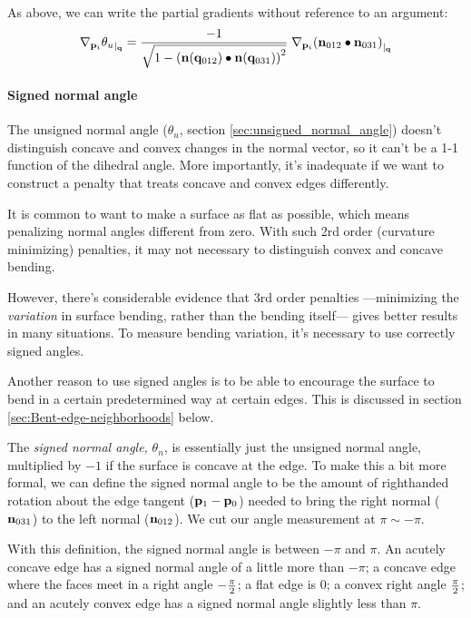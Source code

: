 As above, we can write the partial gradients without reference to an argument:
\begin{equation}
{\mathbf \nabla}_{{\mathbf p}_i}{{\theta_u}}_{\mid_{{\mathbf q}}}
=
{ -1 \over \sqrt{1 - \left( {\mathbf n}({\mathbf q}_{012}) \bullet {\mathbf n}({\mathbf q}_{031}) \right)^2} }
\; {\mathbf \nabla}_{{\mathbf p}_i}{{\left({\mathbf n}_{012}\bullet{\mathbf n}_{031}\right)}}_{\mid_{{\mathbf q}}}
\end{equation}


\paragraph{Signed normal angle}
\label{sec:signed_normal_angle}

The unsigned normal angle
($\theta_u$, section \ref{sec:unsigned_normal_angle})
doesn't distinguish concave and convex changes in the normal vector,
so it can't be a 1-1 function of the dihedral angle.
More importantly, it's inadequate if we want to construct
a penalty that treats concave and convex edges differently.

It is common to want to make a surface as flat as possible,
which means penalizing normal angles different from zero.
With such 2rd order (curvature minimizing) penalties, 
it may not necessary to distinguish
convex and concave bending.

However, there's considerable evidence that
3rd order penalties ---minimizing the {\it variation}
in surface bending, rather than the bending itself---
gives better results in many situations.
To measure bending variation, it's necessary
to use correctly signed angles.

Another reason to use signed angles is to be able
to encourage the surface to bend in a certain
predetermined way at certain edges.
This is discussed in section \ref{sec:Bent-edge-neighborhoods}
below.

The {\it signed normal angle,} $\theta_n$,
is essentially just the
unsigned normal angle, multiplied by $-1$ if the surface is
concave at the edge.
To make this a bit more formal,
we can define the signed normal angle to be the amount
of righthanded rotation about the edge tangent (${\mathbf p}_1 - {\mathbf p}_0$)
needed to bring the right normal (${\mathbf n}_{031}$) to
the left normal (${\mathbf n}_{012}$).
We cut our angle measurement at $\pi \sim -\pi$.

With this definition, the signed normal angle
is between $-\pi$ and $\pi$.
An acutely concave edge has a signed normal angle
of a little more than $-\pi$;
a concave edge where the faces meet in a right angle
$-{\pi \over 2}$;
a flat edge is $0$;
a convex right angle $\pi \over 2$;
and an acutely convex edge has a signed normal angle
slightly less than $\pi$.

